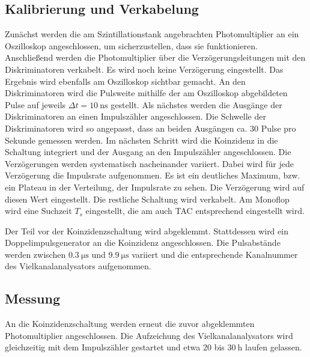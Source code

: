 \subsection{Kalibrierung und Verkabelung}
Zunächst werden die am Szintillationstank angebrachten Photomultiplier an ein Oszilloskop angeschlossen, um sicherzustellen, dass sie funktionieren.
Anschließend werden die Photomultiplier über die Verzögerungsleitungen mit den Diskriminatoren verkabelt. Es wird noch keine Verzögerung eingestellt. Das Ergebnis wird ebenfalls am Oszilloskop sichtbar gemacht. An den Diskriminatoren wird die Pulsweite mithilfe der am Oszilloskop abgebildeten Pulse auf jeweils $\Delta t = \SI{10}{\nano\second}$ gestellt.
Als nächstes werden die Ausgänge der Diskriminatoren an einen Impulszähler angeschlossen. Die Schwelle der Diskriminatoren wird so angepasst, dass an beiden Ausgängen ca. $\num{30}$ Pulse pro Sekunde gemessen werden.
Im nächsten Schritt wird die Koinzidenz in die Schaltung integriert und der Ausgang an den Impulszähler angeschlossen. Die Verzögerungen werden systematisch nacheinander variiert. Dabei wird für jede Verzögerung die Impulsrate aufgenommen. Es ist ein deutliches Maximum, bzw. ein Plateau in der Verteilung, der Impulsrate zu sehen. Die Verzögerung wird auf diesen Wert eingestellt.
Die restliche Schaltung wird verkabelt. 
Am Monoflop wird eine Suchzeit $T_s$ eingestellt, die am auch TAC entsprechend eingestellt wird.

Der Teil vor der Koinzidenzschaltung wird abgeklemmt. Stattdessen wird ein Doppelimpulsgenerator an die Koinzidenz angeschlossen.
Die Pulsabstände werden zwischen $\SI{0.3}{\micro\second}$ und $\SI{9.9}{\micro\second}$ variiert und die entsprechende Kanalnummer des Vielkanalanalysators aufgenommen.

\subsection{Messung}
An die Koinzidenzschaltung werden erneut die zuvor abgeklemmten Photomultiplier angeschlossen. Die Aufzeichung des Vielkanalanalysators wird gleichzeitig mit dem Impulszähler gestartet und etwa $\num{20}$ bis $\SI{30}{\hour}$ laufen gelassen. %